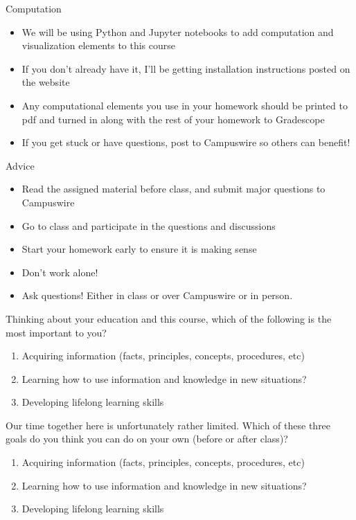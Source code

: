 \documentclass[pdf,aspectratio=169]{beamer}
\begin{document}
\begin{frame}{Computation}
	\begin{itemize}
		\item We will be using Python and Jupyter notebooks to add computation and visualization elements to this course
		\item If you don't already have it, I'll be getting installation instructions posted on the website
		\item Any computational elements you use in your homework should be printed to pdf and turned in along with the rest of your homework to Gradescope
		\item If you get stuck or have questions, post to Campuswire so others can benefit!
	\end{itemize}
\end{frame}

\begin{frame}{Advice}
	\begin{itemize}
		\item Read the assigned material before class, and submit major questions to Campuswire
		\item Go to class and participate in the questions and discussions
		\item Start your homework early to ensure it is making sense
		\item Don't work alone!
		\item Ask questions! Either in class or over Campuswire or in person.
	\end{itemize}
\end{frame}

\begin{frame}{}
	Thinking about your education and this course, which of the following is the most important to you?
	\begin{enumerate}
		\item Acquiring information (facts, principles, concepts, procedures, etc)
		\item Learning how to use information and knowledge in new situations?
		\item Developing lifelong learning skills
	\end{enumerate}
\end{frame}

\begin{frame}{}
	Our time together here is unfortunately rather limited. Which of these three goals do you think you can do on your own (before or after class)?
	\begin{enumerate}
		\item Acquiring information (facts, principles, concepts, procedures, etc)
		\item Learning how to use information and knowledge in new situations?
		\item Developing lifelong learning skills
	\end{enumerate}
\end{frame}
\end{document}
